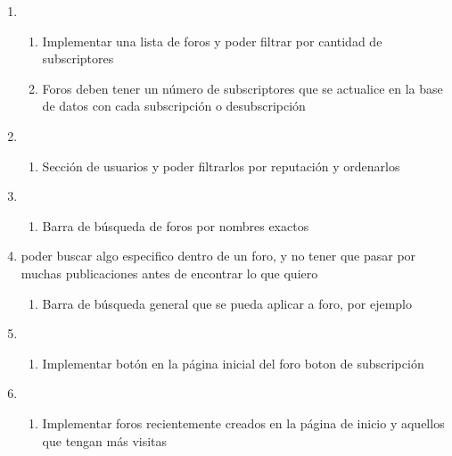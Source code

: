 \documentclass[12pt, letterpaper, notitlepage]{article}
\begin{document}
\begin{enumerate}
    
    \item {}
    	\begin{enumerate}
			\item Implementar una lista de foros y poder filtrar por cantidad de subscriptores
			\item Foros deben tener un número de subscriptores que se actualice en la base de datos con cada subscripción o desubscripción
		\end{enumerate}

    
    \item {}
    	\begin{enumerate}
			\item Sección de usuarios y poder filtrarlos por reputación y ordenarlos
		\end{enumerate}

    
    \item {}
    	\begin{enumerate}
			\item Barra de búsqueda de foros por nombres exactos
		\end{enumerate}

    
    \item {}
    {poder buscar algo especifico dentro de un foro, y no tener que pasar por muchas publicaciones antes de encontrar lo que quiero}
    	\begin{enumerate}
			\item Barra de búsqueda general que se pueda aplicar a foro, por ejemplo 
		\end{enumerate}

    
    \item {}
    	\begin{enumerate}
			\item Implementar botón en la página inicial del foro boton de subscripción
		\end{enumerate}

    
    \item {}
    	\begin{enumerate}
            \item Implementar foros recientemente creados en la página de inicio y aquellos que tengan más visitas
		\end{enumerate}


\end{enumerate}
\end{document}
